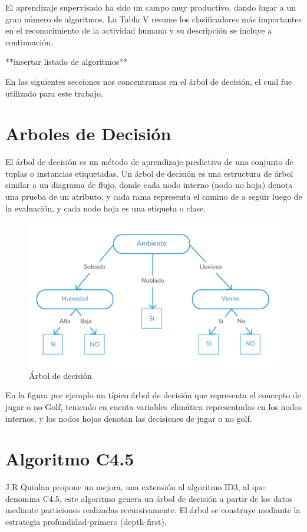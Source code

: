 El aprendizaje supervisado ha sido un campo muy productivo, dando
lugar a un gran número de algoritmos. La Tabla V resume los clasificadores
más importantes en el reconocimiento de la actividad humana y su descripción
se incluye a continuación.

{*}{*}insertar listado de algoritmos{*}{*}

En las siguientes secciones nos concentramos en el árbol de decisión,
el cual fue utilizado para este trabajo.

\section{Arboles de Decisión}

El árbol de decisión es un método de aprendizaje predictivo de una
conjunto de tuplas o instancias etiquetadas. Un árbol de decisión
es una estructura de árbol similar a un diagrama de flujo, donde cada
nodo interno (nodo no hoja) denota una prueba de un atributo, y cada
rama representa el camino de a seguir luego de la evaluación, y cada
nodo hoja es una etiqueta o clase.

\begin{figure}[!htbp]
\centering{}\includegraphics[width=0.7\linewidth]{capitulo-3/graphics/ad_2}
\caption[Árbol de decisión]{\label{fig:arbolEjemplo}Árbol de decisión}
\end{figure}

En la figura por ejemplo un típico árbol de decisión que representa
el concepto de jugar o no Golf, teniendo en cuenta variables climática
representadas en los nodos internos, y los nodos hojas denotan las
decisiones de jugar o no golf.

\section{Algoritmo C4.5}

\label{sec3:algo-c45}J.R Quinlan propone un mejora, una extensión
al algoritmo ID3, al que denomina C4.5, este algoritmo genera un árbol
de decisión a partir de los datos mediante particiones realizadas
recursivamente. El árbol se construye mediante la estrategia profundidad-primero
(depth-first).

